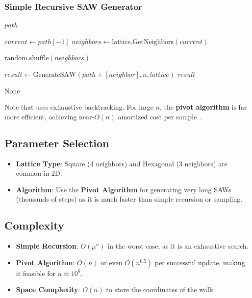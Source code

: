 \subsubsection{Simple Recursive SAW Generator}
\begin{algorithm}
\caption{Generate Self-Avoiding Walk (Recursive)}\label{alg:generate_saw}
\begin{algorithmic}
        \Return $path$
    \EndIf

    \State $current \gets path[-1]$
    \State $neighbors \gets \text{lattice.GetNeighbors}(current)$

    \State $\text{random.shuffle}(neighbors)$

            \State $result \gets \text{GenerateSAW}(path + [neighbor], n, lattice)$
                \Return $result$
            \EndIf
        \EndIf
    \EndFor

    \Return $\text{None}$
\EndFunction
\end{algorithmic}
\end{algorithm}
Note that  uses exhaustive backtracking. For large $n$, the \textbf{pivot algorithm} is far more efficient, achieving near-$O(n)$ amortized cost per sample~\cite{madras1996}.

\subsection{Parameter Selection}
\begin{itemize}
    \item \textbf{Lattice Type}: Square (4 neighbors) and Hexagonal (3 neighbors) are common in 2D.
    \item \textbf{Algorithm}: Use the \textbf{Pivot Algorithm} for generating very long SAWs (thousands of steps) as it is much faster than simple recursion or sampling.
\end{itemize}

\subsection{Complexity}
\begin{itemize}
    \item \textbf{Simple Recursion}: $O(\mu^n)$ in the worst case, as it is an exhaustive search.
    \item \textbf{Pivot Algorithm}: $O(n)$ or even $O(n^{0.5})$ per successful update, making it feasible for $n \approx 10^6$.
    \item \textbf{Space Complexity}: $O(n)$ to store the coordinates of the walk.
\end{itemize}

